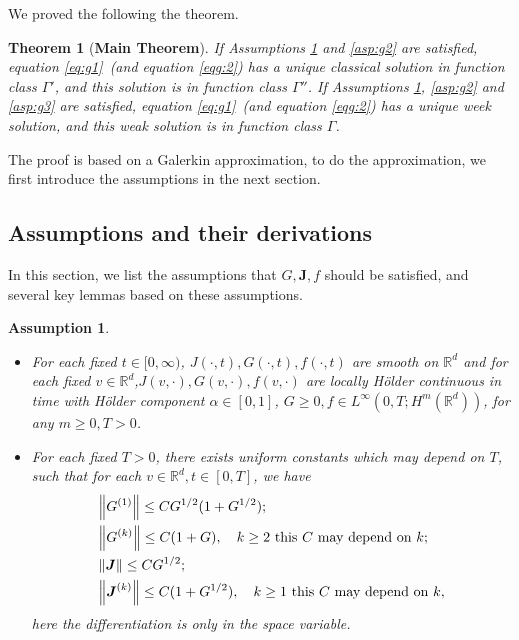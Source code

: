 \documentclass[a4paper, 11pt]{article}
\newcounter{results}[section]
\theoremstyle{plain}
\newtheorem{theorem}[results]{Theorem}
\newtheorem{assumption}[results]{Assumption}
\theoremstyle{remark}
\theoremstyle{definition}
\newcommand{\J}{\boldsymbol{J}}
\begin{document}
        
We proved the following the theorem.
\begin{theorem}[\textbf{Main Theorem}]\label{thm:main}
    If Assumptions \ref{asp:g1} and \ref{asp:g2} are satisfied, equation \eqref{eq:g1}~(and equation \eqref{eqg:2}) has a unique classical solution in function class $\Gamma'$, and this solution is in function class $\Gamma''$. If Assumptions \ref{asp:g1}, \ref{asp:g2} and \ref{asp:g3} are satisfied, equation \eqref{eq:g1}~(and equation \eqref{eqg:2}) has a unique week solution, and this weak solution is in function class $\Gamma$.
\end{theorem}
The proof is based on a Galerkin approximation, to do the approximation, we first introduce the assumptions in the next section.

\subsection{Assumptions and their derivations}\label{sec:aspaddr}
In this section, we list the assumptions that $G,\J,f$ should be satisfied, and several key lemmas based on these assumptions.
		\begin{assumption}\label{asp:g1}
			\begin{itemize}
                    \item For each fixed $t\in [0,\infty)$, $J(\cdot,t),G(\cdot,t),f(\cdot,t)$ are smooth on $\mathbb{R}^d$ and for each fixed $v\in\mathbb{R}^d$,$J(v,\cdot),G(v,\cdot),f(v,\cdot)$ are locally H\"older continuous in time with H\"older component $\alpha\in [0,1]$, $G\geq 0,f\in L^{\infty}(0,T;H^m(\mathbb{R}^d))$, for any $m\geq0,T>0$.
                    \item For each fixed $T>0$, there exists uniform constants which may depend on $T$, such that for each $v\in\mathbb{R}^d,t\in [0,T]$, we have
                    \begin{equation*}
                        \begin{aligned}
                            &\norm{G^{(1)}}\leq CG^{1/2}(1+G^{1/2});\\
                        &\norm{G^{(k)}}\leq C(1+G), \quad k\geq 2\text{ this $C$ may depend on $k$};\\
                        &\norm{\J}\leq CG^{1/2};\\
                        &\norm{\J^{(k)}}\leq C(1+G^{1/2}),\quad k\geq 1\text{ this $C$ may depend on $k$},
                        \end{aligned}
                    \end{equation*}
                    here the differentiation is only in the space variable.
			\end{itemize}
		\end{assumption}
		
\end{document}
